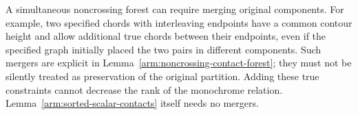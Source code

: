 \begin{remark}\label{arm:contact-mergers}
A simultaneous noncrossing forest can require merging original
components.  For example, two specified chords with interleaving
endpoints have a common contour height and allow additional true
chords between their endpoints, even if the specified graph initially
placed the two pairs in different components.  Such mergers are
explicit in Lemma~\ref{arm:noncrossing-contact-forest}; they must not be
silently treated as preservation of the original partition.  Adding
these true constraints cannot decrease the rank of the monochrome
relation.  Lemma~\ref{arm:sorted-scalar-contacts} itself needs no mergers.
\end{remark}
